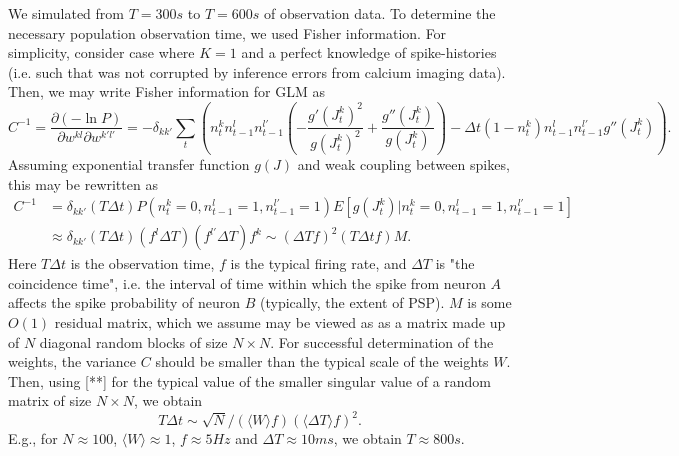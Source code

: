 \documentclass[amsmath,amssymb]{revtex4}
\begin{document}
We simulated from $T=300s$ to $T=600s$ of observation data. To determine the necessary population observation time, we used Fisher information. For simplicity, consider case where $K=1$ and a perfect knowledge of spike-histories (i.e. such that was not corrupted by inference errors from calcium imaging data). Then, we may write Fisher information for GLM as
\begin{equation}
C^{-1}=\frac{\partial (-\ln P)}{\partial w^{kl}\partial w^{k'l'}}
=-\delta_{kk'}\sum\limits_t\left(
n^k_tn^{l}_{t-1}n^{l'}_{t-1}\left(-\frac{g'(J^k_t)^2}{g(J^k_t)^2} +
\frac{g''(J^k_t)}{g(J^k_t)}\right)
-\Delta t (1-n^k_t)n^{l}_{t-1}n^{l'}_{t-1}g''(J^k_t)\right).
\end{equation}
Assuming exponential transfer function $g(J)$ and weak coupling between spikes, this may be rewritten as
\begin{equation}
\begin{array}{rl}
C^{-1}
&=\delta_{kk'} (T\Delta t) P(n^k_t=0,n^l_{t-1}=1,n^{l'}_{t-1}=1)E[g(J^k_t)|n^k_t=0,n^l_{t-1}=1,n^{l'}_{t-1}=1] \\
&\approx \delta_{kk'}(T\Delta t)(f^l\Delta T)(f^{l'}\Delta T)f^k
\sim (\Delta T f)^2(T\Delta t f) M.
\end{array}
\end{equation}
Here $T\Delta t$ is the observation time,
$f$ is the typical firing rate, and $\Delta T$ is "the coincidence time", i.e. the interval of time within which the spike from neuron $A$ affects the spike probability of neuron $B$ (typically, the extent of PSP). $M$ is some $O(1)$ residual matrix, which we assume may be viewed as as a matrix made up of $N$ diagonal random blocks of size $N\times N$. For successful determination of the weights,  the variance $C$ should be smaller than the typical scale of the weights $W$. Then, using [**] for the typical value of the smaller singular value of a random matrix of size $N\times N$, we obtain
\begin{equation}
T\Delta t \sim \sqrt{N}/(\langle W\rangle f)(\langle\Delta T\rangle f)^2.
\end{equation}
E.g., for $N\approx 100$, $\langle W\rangle\approx 1$, $f\approx 5Hz$ and $\Delta T\approx 10ms$, we obtain $T\approx 800s$.


\end{document}
